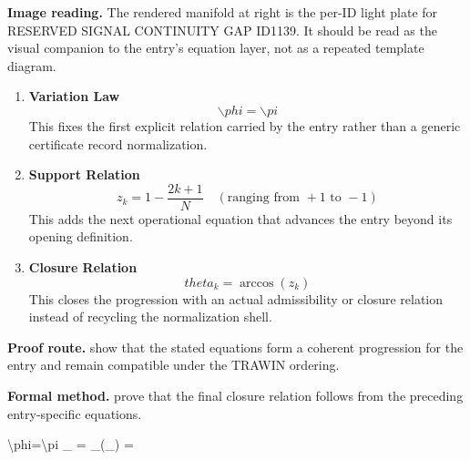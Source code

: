 \begin{samepage}
\noindent\begin{minipage}[t]{0.45\linewidth}
\vspace{0pt}
\raggedright
\scriptsize\textbf{Image reading.} The rendered manifold at right is the per-ID light plate for RESERVED SIGNAL CONTINUITY GAP ID1139. It should be read as the visual companion to the entry's equation layer, not as a repeated template diagram.\par
\end{minipage}\hfill
\begin{minipage}[t]{0.53\linewidth}
\vspace*{-0.10in}
\raggedright
{}
\end{minipage}
\end{samepage}

\clearpage


\begin{enumerate}[leftmargin=1.6em,itemsep=9pt,topsep=6pt]
\item \textbf{Variation Law}
\[
\backslash phi=\backslash pi
\]
This fixes the first explicit relation carried by the entry rather than a generic certificate record normalization.

\item \textbf{Support Relation}
\[
z_k = 1 - \frac{2k+1}{N} \quad (\text{ranging from } +1 \text{ to } -1)
\]
This adds the next operational equation that advances the entry beyond its opening definition.

\item \textbf{Closure Relation}
\[
theta_k = \arccos(z_k)
\]
This closes the progression with an actual admissibility or closure relation instead of recycling the normalization shell.
\end{enumerate}

\textbf{Proof route.} show that the stated equations form a coherent progression for the entry and remain compatible under the TRAWIN ordering.

\textbf{Formal method.} prove that the final closure relation follows from the preceding entry-specific equations.

\medskip
{}

\begin{tzpsnapshot}
\end{tzpsnapshot}

\tzpequationlinks
  {\backslash phi=\backslash pi}
  {_{} = \cdots}
  {_{}\!\left(_{}\right) = \cdots}
